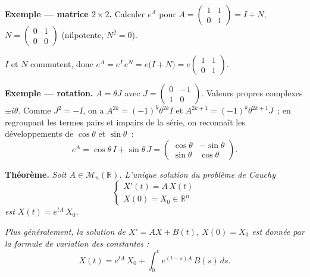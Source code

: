 \begin{mdframed}[style=exbar]
  \textbf{Exemple — matrice $2\times 2$.}\enspace%
  Calculer $e^A$ pour $A = \begin{pmatrix}1&1\\0&1\end{pmatrix} = I + N$,
  $N = \begin{pmatrix}0&1\\0&0\end{pmatrix}$ (nilpotente, $N^2=0$).

  $I$ et $N$ commutent, donc $e^A = e^I\,e^N = e\bigl(I+N\bigr)
  = e\begin{pmatrix}1&1\\0&1\end{pmatrix}$.

  \medskip
  \textbf{Exemple — rotation.}\enspace%
  $A = \theta J$ avec $J = \begin{pmatrix}0&-1\\1&0\end{pmatrix}$.
  Valeurs propres complexes $\pm i\theta$. Comme $J^2 = -I$, on a
  $A^{2k} = (-1)^k\theta^{2k}I$ et $A^{2k+1} = (-1)^k\theta^{2k+1}J$~; en
  regroupant les termes pairs et impairs de la série, on reconnaît les
  développements de $\cos\theta$ et $\sin\theta$~:
  \[
    e^A = \cos\theta\,I + \sin\theta\,J
        = \begin{pmatrix}\cos\theta & -\sin\theta\\\sin\theta & \cos\theta\end{pmatrix}.
  \]
\end{mdframed}

\decsep{}


\begin{tcolorbox}[thmbox]
  \textbf{Théorème.}\enspace%
  \textit{Soit $A \in \mathcal{M}_n(\mathbb{R})$. L'unique solution du
  problème de Cauchy}
  \[
    \begin{cases} X'(t) = A\,X(t) \\ X(0) = X_0 \in \mathbb{R}^n \end{cases}
  \]
  \textit{est $X(t) = e^{tA}\,X_0$.}

  \medskip
  \textit{Plus généralement, la solution de $X' = AX + B(t)$,
  $X(0)=X_0$ est donnée par la formule de variation des constantes :}
  \[
    X(t) = e^{tA}\,X_0 + \int_0^t e^{(t-s)A}\,B(s)\,ds.
  \]
\end{tcolorbox}

